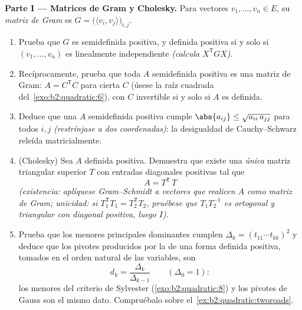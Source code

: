 \begin{problem}
\medskip
\noindent\textbf{Parte I --- Matrices de Gram y Cholesky.} Para
vectores $v_1, \dots, v_n \in E$, su \emph{matriz de Gram} es $G =
\bigl(\langle v_i, v_j\rangle\bigr)_{i,j}$.
\begin{enumerate}
  \item Prueba que $G$ es  semidefinida positiva, y
        definida positiva si y solo si $(v_1, \dots, v_n)$ es
        linealmente independiente \emph{(calcula $X^{\mathsf
        T}GX$)}.
  \item Recíprocamente, prueba que toda $A$  semidefinida
        positiva es una matriz de Gram: $A = C^{\mathsf T}C$ para
        cierta $C$ (úsese la raíz cuadrada del~\cref{exo:b2:quadratic:6}), con $C$ invertible si y solo si
        $A$ es definida.
  \item Deduce que una $A$ semidefinida positiva cumple
        $\abs{a_{ij}} \leq \sqrt{a_{ii}\,a_{jj}}$ para todos $i, j$
        \emph{(restrínjase a dos coordenadas)}: la desigualdad de
        Cauchy--Schwarz releída matricialmente.
  \item (Cholesky) Sea $A$ definida positiva. Demuestra que existe
        una \emph{única} matriz triangular superior $T$ con entradas
        diagonales positivas tal que
        \[
        A = T^{\mathsf T}\,T
        \]
        \emph{(existencia: aplíquese Gram--Schmidt a vectores que
        realicen $A$ como matriz de Gram; unicidad: si $T_1^{\mathsf
        T}T_1 = T_2^{\mathsf T}T_2$, pruébese que $T_1T_2^{-1}$ es
        ortogonal y triangular con diagonal positiva, luego $I$)}.
  \item Prueba que los menores principales dominantes cumplen
        $\Delta_k = (t_{11}\cdots t_{kk})^2$ y deduce que los
        pivotes producidos por la  de una forma
        definida positiva, tomados en el orden natural de las
        variables, son
        \[
        d_k = \frac{\Delta_k}{\Delta_{k-1}}
        \qquad (\Delta_0 = 1) :
        \]
        los menores del criterio de Sylvester
        (\cref{exo:b2:quadratic:8}) y los pivotes de Gauss son el
        mismo dato. Compruébalo sobre el~\cref{ex:b2:quadratic:tworoads}.
\end{enumerate}


\end{problem}
